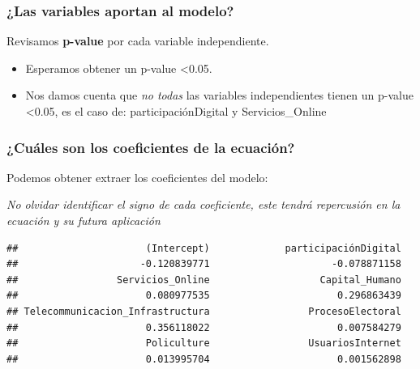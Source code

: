 \documentclass[
]{article}
\newenvironment{Shaded}{\begin{snugshade}}{\end{snugshade}}
\newcommand{\NormalTok}[1]{#1}
\newcommand{\SpecialCharTok}[1]{\textcolor[rgb]{0.81,0.36,0.00}{\textbf{#1}}}
\providecommand{\tightlist}{%
  \setlength{\itemsep}{0pt}\setlength{\parskip}{0pt}}
\begin{document}
\subsubsection{\texorpdfstring{\textbf{¿Las variables aportan al
modelo?}}{¿Las variables aportan al modelo?}}\label{las-variables-aportan-al-modelo}

Revisamos \textbf{p-value} por cada variable independiente.

\begin{itemize}
\tightlist
\item
  Esperamos obtener un p-value \textless0.05.
\item
  Nos damos cuenta que \emph{no todas} las variables independientes
  tienen un p-value \textless0.05, es el caso de: participaciónDigital y
  Servicios\_Online
\end{itemize}

\subsubsection{\texorpdfstring{\textbf{¿Cuáles son los coeficientes de
la
ecuación?}}{¿Cuáles son los coeficientes de la ecuación?}}\label{cuuxe1les-son-los-coeficientes-de-la-ecuaciuxf3n}

Podemos obtener extraer los coeficientes del modelo:

\emph{No olvidar identificar el signo de cada coeficiente, este tendrá
repercusión en la ecuación y su futura aplicación}

\begin{Shaded}
\end{Shaded}

\begin{verbatim}
##                      (Intercept)             participaciónDigital 
##                     -0.120839771                     -0.078871158 
##                 Servicios_Online                   Capital_Humano 
##                      0.080977535                      0.296863439 
## Telecommunicacion_Infrastructura                 ProcesoElectoral 
##                      0.356118022                      0.007584279 
##                      Policulture                 UsuariosInternet 
##                      0.013995704                      0.001562898
\end{verbatim}
\end{document}
